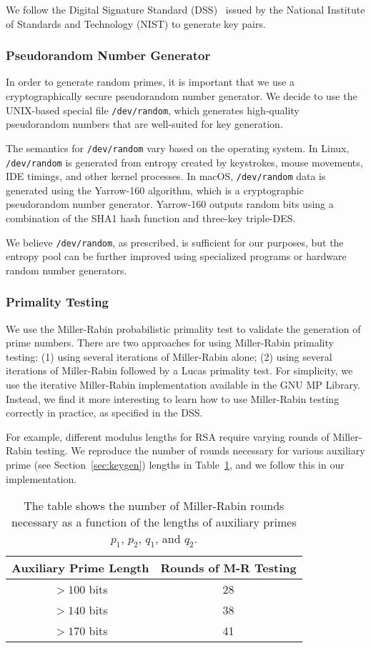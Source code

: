 \documentclass[a4paper]{article}
\begin{document}
We follow the Digital Signature Standard (DSS)~\cite{fips2013186} issued by the National Institute of Standards and Technology (NIST) to generate key pairs.

\subsubsection{Pseudorandom Number Generator}\label{sec:prng}
In order to generate random primes, it is important that we use a cryptographically secure pseudorandom number generator. We decide to use the UNIX-based special file {\tt /dev/random}, which generates high-quality pseudorandom numbers that are well-suited for key generation.

The semantics for {\tt /dev/random} vary based on the operating system. In Linux,  {\tt /dev/random} is generated from entropy created by keystrokes, mouse movements, IDE timings, and other kernel processes. In macOS, {\tt /dev/random} data is generated using the Yarrow-160 algorithm, which is a cryptographic pseudorandom number generator. Yarrow-160 outputs random bits using a combination of the SHA1 hash function and three-key triple-DES.

We believe {\tt /dev/random}, as prescribed, is sufficient for our purposes, but the entropy pool can be further improved using specialized programs or hardware random number generators.

\subsubsection{Primality Testing}

We use the Miller-Rabin probabilistic primality test to validate the generation of prime numbers. There are two approaches for using Miller-Rabin primality testing: (1) using several iterations of Miller-Rabin alone; (2) using several iterations of Miller-Rabin followed by a Lucas primality test. For simplicity, we use the iterative Miller-Rabin implementation available in the GNU MP Library. Instead, we find it more interesting to learn how to use Miller-Rabin testing correctly
in practice, as specified in the DSS.

For example, different modulus lengths for RSA require varying rounds of Miller-Rabin testing. We reproduce the number of rounds necessary for various auxiliary prime (see Section~\ref{sec:keygen}) lengths in Table~\ref{tab:mr}, and we follow this in our implementation.

\begin{table}[h]
\centering
\begin{tabular}{|c|c|} 
 \hline
 Auxiliary Prime Length & Rounds of M-R Testing  \\ \hline
 $>100$ bits & 28 \\ 
 $>140$ bits & 38 \\ 
 $>170$ bits & 41 \\
 \hline
\end{tabular}
\caption{The table shows the number of Miller-Rabin rounds necessary as a function of the lengths of auxiliary primes $p_1$, $p_2$, $q_1$, and $q_2$.}
\label{tab:mr}
\end{table}
\end{document}
